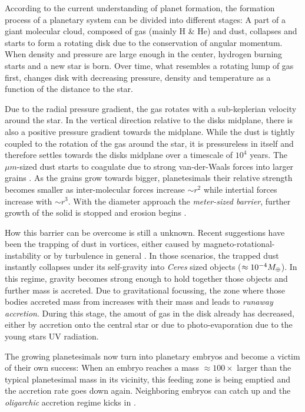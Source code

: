 According to the current understanding of planet formation, the formation process of a planetary system can be divided into different stages: A part of a giant molecular cloud, composed of gas (mainly H \& He) and dust, collapses and starts to form a rotating disk due to the conservation of angular momentum. When density and pressure are large enough in the center, hydrogen burning starts and a new star is born. Over time, what resembles a rotating lump of gas first, changes disk with decreasing pressure, density and temperature as a function of the distance to the star.

Due to the radial pressure gradient, the gas rotates with a sub-keplerian velocity around the star. In the vertical direction relative to the disks midplane, there is also a positive pressure gradient towards the midplane. While the dust is tightly coupled to the rotation of the gas around the star, it is pressureless in itself and therefore settles towards the disks midplane over a timescale of $10^4$ years. The $\mu m$-sized dust starts to coagulate due to strong van-der-Waals forces into larger grains \citep{2010A&A...513A..56G}. As the grains grow towards bigger, planetesimals their relative strength becomes smaller as inter-molecular forces increase $\sim r^2$ while intertial forces increase with $\sim r^3$. With the diameter approach the \emph{meter-sized barrier}, further growth of the solid is stopped and erosion begins \cite{Benz1999Icar..142....5B}.

How this barrier can be overcome is still a unknown. Recent suggestions have been the trapping of dust in vortices, either caused by magneto-rotational-instability \citep{Johansen:2007p37} or by turbulence in general \citep{2008ApJ...686.1292I}. In those scenarios, the trapped dust instantly collapses under its self-gravity into \emph{Ceres} sized objects ($\approx 10^{-4} M_{\oplus}$). In this regime, gravity becomes strong enough to hold together those objects and further mass is accreted. Due to gravitational focussing, the zone where those bodies accreted mass from increases with their mass and leads to \emph{runaway accretion}. During this stage, the amout of gas in the disk already has decreased, either by accretion onto the central star or due to photo-evaporation due to the young stars UV radiation.

The growing planetesimals now turn into planetary embryos and become a victim of their own success: When an embryo reaches a mass $\approx 100\times$ larger than the typical planetesimal mass in its vicinity, this feeding zone is being emptied and the accretion rate goes down again. Neighboring embryos can catch up and the \emph{oligarchic} accretion regime kicks in \citep{1993Icar..106..210I, 2010ApJ...714L.103O}.

